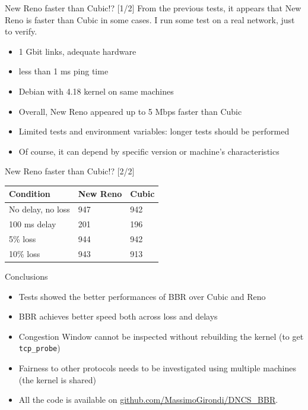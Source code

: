 \documentclass[13pt,aspectratio=43]{beamer}
\begin{document}
\begin{frame}{New Reno faster than Cubic!? [1/2]}
	From the previous tests, it appears that New Reno is faster than Cubic in some cases.
	I run some test on a real network, just to verify.
	\begin{itemize}
		\item 1 Gbit links, adequate hardware
		\item less than 1 ms ping time
		\item Debian with 4.18 kernel on same machines
		\item Overall, New Reno appeared up to 5 Mbps faster than Cubic
		\item Limited tests and environment variables: longer tests should be performed
		\item Of course, it can depend by specific version or machine's characteristics
	\end{itemize}
\end{frame}

\begin{frame}{New Reno faster than Cubic!? [2/2]}
\begin{table}[]
\begin{tabular}{l|l|l}
\textbf{Condition} & \textbf{New Reno} & \textbf{Cubic} \\ \hline
No delay, no loss  & 947               & 942            \\
100 ms delay       & 201               & 196            \\
5\% loss           & 944               & 942            \\
10\% loss          & 943               & 913           
\end{tabular}
\end{table}
\end{frame}

\begin{frame}{Conclusions}
	\begin{itemize}
		\item Tests showed the better performances of BBR over Cubic and Reno
		\item BBR achieves better speed both across loss and delays
		\item Congestion Window cannot be inspected without rebuilding the kernel (to get \texttt{tcp\_probe})
		\item Fairness to other protocols needs to be investigated using multiple machines (the kernel is shared)
        \item All the code is available on \url{github.com/MassimoGirondi/DNCS_BBR}.
	\end{itemize}
\end{frame}
\end{document}
